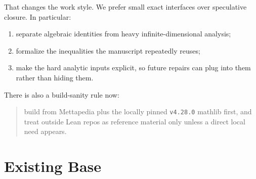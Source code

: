 \documentclass[11pt]{article}
\theoremstyle{remark}
\begin{document}
That changes the work style.  We prefer small exact interfaces over speculative
closure.  In particular:
\begin{enumerate}[leftmargin=1.5em]
  \item separate algebraic identities from heavy infinite-dimensional analysis;
  \item formalize the inequalities the manuscript repeatedly reuses;
  \item make the hard analytic inputs explicit, so future repairs can plug into
  them rather than hiding them.
\end{enumerate}

There is also a build-sanity rule now:
\begin{quote}
build from Mettapedia plus the locally pinned \texttt{v4.28.0} mathlib first,
and treat outside Lean repos as reference material only unless a direct local
need appears.
\end{quote}

\section{Existing Base}
\end{document}
